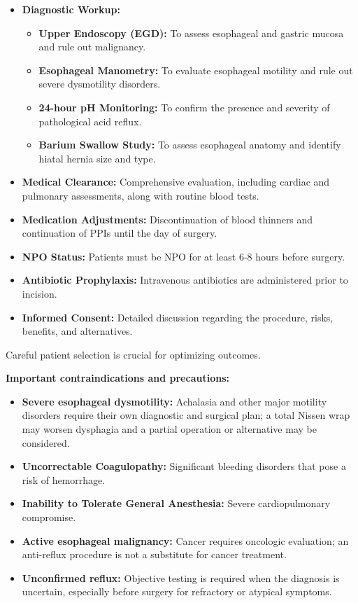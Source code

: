 \begin{itemize}
  \item \textbf{Diagnostic Workup:}
    \begin{itemize}
      \item \textbf{Upper Endoscopy (EGD):} To assess esophageal and gastric mucosa and rule out malignancy.
      \item \textbf{Esophageal Manometry:} To evaluate esophageal motility and rule out severe dysmotility disorders.
      \item \textbf{24-hour pH Monitoring:} To confirm the presence and severity of pathological acid reflux.
      \item \textbf{Barium Swallow Study:} To assess esophageal anatomy and identify hiatal hernia size and type.
    \end{itemize}
  
  \item \textbf{Medical Clearance:} Comprehensive evaluation, including cardiac and pulmonary assessments, along with routine blood tests.

  \item \textbf{Medication Adjustments:} Discontinuation of blood thinners and continuation of PPIs until the day of surgery.

  \item \textbf{NPO Status:} Patients must be NPO for at least 6-8 hours before surgery.

  \item \textbf{Antibiotic Prophylaxis:} Intravenous antibiotics are administered prior to incision.

  \item \textbf{Informed Consent:} Detailed discussion regarding the procedure, risks, benefits, and alternatives.
\end{itemize}

Careful patient selection is crucial for optimizing outcomes.

\textbf{Important contraindications and precautions:}
\begin{itemize}
  \item \textbf{Severe esophageal dysmotility:} Achalasia and other major motility disorders require their own diagnostic and surgical plan; a total Nissen wrap may worsen dysphagia and a partial operation or alternative may be considered.
  \item \textbf{Uncorrectable Coagulopathy:} Significant bleeding disorders that pose a risk of hemorrhage.
  \item \textbf{Inability to Tolerate General Anesthesia:} Severe cardiopulmonary compromise.
  \item \textbf{Active esophageal malignancy:} Cancer requires oncologic evaluation; an anti-reflux procedure is not a substitute for cancer treatment.
  \item \textbf{Unconfirmed reflux:} Objective testing is required when the diagnosis is uncertain, especially before surgery for refractory or atypical symptoms.
\end{itemize}

